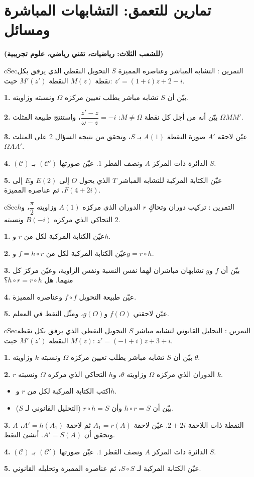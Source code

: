 \documentclass[12pt,a4paper]{article}
\newenvironment{BOX}[2]{\begin{otherlanguage}{english}\begin{arbox}{#1}{#2}}{\end{arbox}\end{otherlanguage}}
\newcounter{exo}
\newenvironment{tamrin}[1]{\stepcounter{exo}\begin{BOX}{cSec}{التمرين \theexo: #1}}{\end{BOX}}
\newenvironment{sq}{\begin{itemize}[leftmargin=2.4em,itemsep=3pt]}{\end{itemize}}
\newcommand{\qa}{\item[(أ)]}\newcommand{\qb}{\item[(ب)]}\newcommand{\qc}{\item[(جـ)]}\newcommand{\qd}{\item[(د)]}\newcommand{\qe}{\item[(هـ)]}
\newcommand{\QQ}[1]{\par\smallskip\textbf{#1.} }
\begin{document}
\section{تمارين للتعمق: التشابهات المباشرة ومسائل}
\textbf{(للشعب الثلاث: رياضيات، تقني رياضي، علوم تجريبية)}

\begin{tamrin}{التشابه المباشر وعناصره المميزة}
$S$ التحويل النقطي الذي يرفق بكل نقطة $M(z)$ النقطة $M'(z')$ حيث: $z'=(1+i)z+2-i$.
\QQ{1} بيّن أن $S$ تشابه مباشر يطلب تعيين مركزه $\Omega$ ونسبته وزاويته.
\QQ{2} بيّن أنه من أجل كل نقطة $M\neq\Omega$: $\dfrac{z'-z}{\omega-z}=-i$، واستنتج طبيعة المثلث $\Omega MM'$.
\QQ{3} عيّن لاحقة $A'$ صورة النقطة $A(1)$ بـ $S$، وتحقق من نتيجة السؤال 2 على المثلث $\Omega AA'$.
\QQ{4} $(\mathcal C)$ الدائرة ذات المركز $A$ ونصف القطر $1$. عيّن صورتها $(\mathcal C')$ بـ $S$.
\QQ{5} عيّن الكتابة المركبة للتشابه المباشر $T$ الذي يحول $O$ إلى $E(2)$ و$E$ إلى $F(4+2i)$، ثم عناصره المميزة.
\end{tamrin}

\begin{tamrin}{تركيب دوران وتحاكٍ}
$r$ الدوران الذي مركزه $A(1)$ وزاويته $\dfrac\pi2$، و$h$ التحاكي الذي مركزه $B(-i)$ ونسبته $2$.
\QQ{1} عيّن الكتابة المركبة لكل من $r$ و$h$.
\QQ{2} عيّن الكتابة المركبة لكل من $f=h\circ r$ و$g=r\circ h$.
\QQ{3} بيّن أن $f$ و$g$ تشابهان مباشران لهما نفس النسبة ونفس الزاوية، وعيّن مركز كل منهما. هل $h\circ r=r\circ h$؟
\QQ{4} عيّن طبيعة التحويل $f\circ f$ وعناصره المميزة.
\QQ{5} عيّن لاحقتي $f(O)$ و$g(O)$، ومثّل النقط في المعلم.
\end{tamrin}

\begin{tamrin}{التحليل القانوني لتشابه مباشر}
$S$ التحويل النقطي الذي يرفق بكل نقطة $M(z)$ النقطة $M'(z')$ حيث: $z'=(-1+i)z+3+i$.
\QQ{1} بيّن أن $S$ تشابه مباشر يطلب تعيين مركزه $\Omega$ ونسبته $k$ وزاويته $\theta$.
\QQ{2} $r$ الدوران الذي مركزه $\Omega$ وزاويته $\theta$، و$h$ التحاكي الذي مركزه $\Omega$ ونسبته $k$.
\begin{sq}
\qa اكتب الكتابة المركبة لكل من $r$ و$h$.
\qb بيّن أن $h\circ r=S$ وأن $r\circ h=S$ (التحليل القانوني لـ $S$).
\end{sq}
\QQ{3} $A$ النقطة ذات اللاحقة $2+2i$. عيّن لاحقة $A_1=r(A)$ ثم لاحقة $A'=h(A_1)$، وتحقق أن $A'=S(A)$. أنشئ النقط.
\QQ{4} $(\mathcal C)$ الدائرة ذات المركز $A$ ونصف القطر $1$. عيّن صورتها $(\mathcal C')$ بـ $S$.
\QQ{5} عيّن الكتابة المركبة لـ $S\circ S$، ثم عناصره المميزة وتحليله القانوني.
\end{tamrin}
\end{document}

